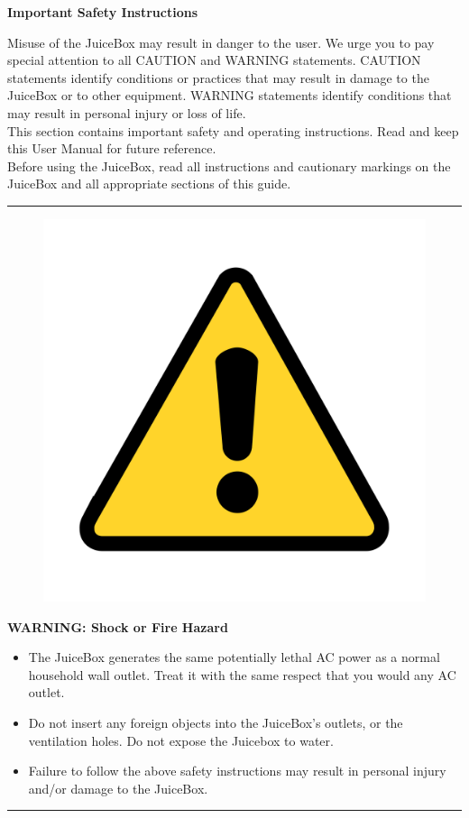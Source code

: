\documentclass[10pt]{article}
\begin{document}
\begin{flushleft}
	{\huge \textbf{Important Safety Instructions} \par}
	\vspace{1cm}

	\leftskip=3cm 						%
	\begin{large} 		
		Misuse of the JuiceBox may result in danger to the user. We urge you to
		pay special attention to all CAUTION and WARNING statements.
		CAUTION statements identify conditions or practices that may result in
		damage to the JuiceBox or to other equipment. WARNING statements
		identify conditions that may result in personal injury or loss of life.\\
		\vspace{3mm}
		This section contains important safety and operating instructions. Read
		and keep this User Manual for future reference.\\
		\vspace{3mm}
		Before using the JuiceBox, read all instructions and
		cautionary markings on the JuiceBox and all appropriate sections of
		this guide.
	\end{large}
\end{flushleft}

\hrule 								%

\begin{figure} 					%
    \includegraphics[width=.75in]{warning_y} 	%
\end{figure}

\vspace{5mm}
\noindent   							%
\Large{\textbf{WARNING: Shock or Fire Hazard}} \\
\begin{large}                                        
	\begin{itemize}
		\item{The JuiceBox generates the same potentially lethal AC power as a normal
			household wall outlet. Treat it with the same respect that you would any AC	
			outlet.}
		\item{Do not insert any foreign objects into the JuiceBox's outlets, or the ventilation holes. 
			 Do not expose the Juicebox to water.}
		\item{Failure to follow the above safety instructions may result in personal injury
			and/or damage to the JuiceBox.}
	\end{itemize}
\end{large}
\hrule
\end{document}
